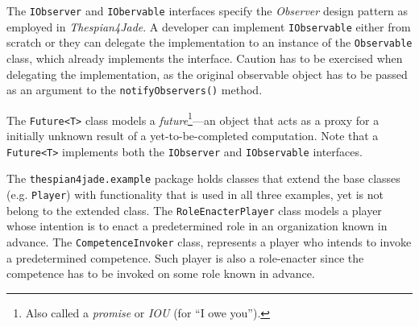 The \texttt{IObserver} and \texttt{IObervable} interfaces specify the \textit{Observer} design pattern as employed in \textit{Thespian4Jade}.
A developer can implement \texttt{IObservable} either from scratch or they can delegate the implementation to an instance of the \texttt{Observable} class, which already implements the interface.
Caution has to be exercised when delegating the implementation, as the original observable object has to be passed as an argument to the \texttt{notifyObservers()} method.

The \texttt{Future<T>} class models a \textit{future}\footnote{Also called a \textit{promise} or \textit{IOU} (for ``I owe you'').}---an object that acts as a proxy for a initially unknown result of a yet-to-be-completed computation.
Note that a \texttt{Future<T>} implements both the \texttt{IObserver} and \texttt{IObservable} interfaces.

The \texttt{thespian4jade.example} package holds classes that extend the base classes (e.g. \texttt{Player}) with functionality that is used in all three examples, yet is not belong to the extended class.
The \texttt{RoleEnacterPlayer} class models a player whose intention is to enact a predetermined role in an organization known in advance.
The \texttt{CompetenceInvoker} class, represents a player who intends to invoke a predetermined competence. Such player is also a role-enacter since the competence has to be invoked on some role known in advance.